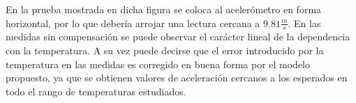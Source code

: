 \documentclass[main]{subfiles}
\begin{document}
En la prueba mostrada en dicha figura se coloca al acelerómetro en forma horizontal, por lo que debería arrojar una lectura cercana a $9.81\frac{m}{s}$. En las medidas sin compensación se puede observar el carácter lineal de la dependencia con la temperatura. A su vez puede decirse que el error introducido por la temperatura en las medidas es corregido en buena forma por el modelo propuesto, ya que se obtienen valores de aceleración cercanos a los esperados en todo el rango de temperaturas estudiados.
\end{document}
